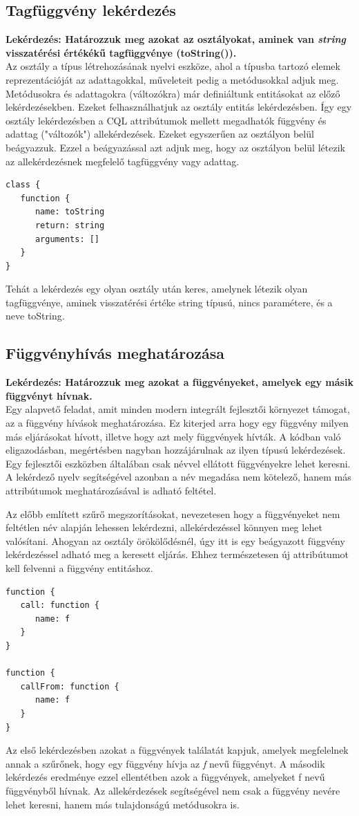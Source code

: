 \documentclass[a4paper,12pt]{report}
\begin{document}
\subsection{Tagfüggvény lekérdezés}
\textbf{Lekérdezés: Határozzuk meg azokat az osztályokat, aminek van \textit{string} visszatérési értékékű tagfüggvénye (toString()).}
\\
Az osztály a típus létrehozásának nyelvi eszköze, ahol a típusba tartozó elemek reprezentációját az adattagokkal, műveleteit pedig a metódusokkal adjuk meg. Metódusokra és adattagokra (változókra) már definiáltunk entitásokat az előző lekérdezésekben. Ezeket felhasználhatjuk az osztály entitás lekérdezésben. Így egy osztály lekérdezésben a CQL attribútumok mellett megadhatók függvény és adattag ("változók") allekérdezések. Ezeket egyszerűen az osztályon belül beágyazzuk. Ezzel a beágyazással azt adjuk meg, hogy az osztályon belül létezik az allekérdezésnek megfelelő tagfüggvény vagy adattag.
\begin{verbatim}
class {
   function {
      name: toString
      return: string
      arguments: []
   }
}
\end{verbatim}
Tehát a lekérdezés egy olyan osztály után keres, amelynek létezik olyan tagfüggvénye, aminek visszatérési értéke string típusú, nincs paramétere, és a neve toString.
\subsection{Függvényhívás meghatározása}
\textbf{Lekérdezés: Határozzuk meg azokat a függvényeket, amelyek egy másik függvényt hívnak.}
\\
Egy alapvető feladat, amit minden modern integrált fejlesztői környezet támogat, az a függvény hívások meghatározása. Ez kiterjed arra hogy egy függvény milyen más eljárásokat hívott, illetve hogy azt mely függvények hívták. A kódban való eligazodásban, megértésben nagyban hozzájárulnak az ilyen típusú lekérdezések. Egy fejlesztői eszközben általában csak névvel ellátott függvényekre lehet keresni. A lekérdező nyelv segítségével azonban a név megadása nem kötelező, hanem más attribútumok meghatározásával is adható feltétel.
\par  Az előbb említett szűrő megszorításokat, nevezetesen hogy a függvényeket nem feltétlen név alapján lehessen lekérdezni, allekérdezéssel könnyen meg lehet valósítani. Ahogyan az osztály örökölődésnél, úgy itt is egy beágyazott függvény lekérdezéssel adható meg a keresett eljárás. Ehhez természetesen új attribútumot kell felvenni a függvény entitáshoz.
\begin{verbatim}
function {
   call: function { 
      name: f 
   }
}

function {
   callFrom: function { 
      name: f 
   }
}
\end{verbatim}
\par Az első lekérdezésben azokat a függvények találatát kapjuk, amelyek megfelelnek annak a szűrőnek, hogy egy függvény hívja az \textit{f} nevű függvényt. A második lekérdezés eredménye ezzel ellentétben azok a függvények, amelyeket f nevű függvényből hívnak. Az allekérdezések segítségével nem csak a függvény nevére lehet keresni, hanem más tulajdonságú metódusokra is.
\end{document}
